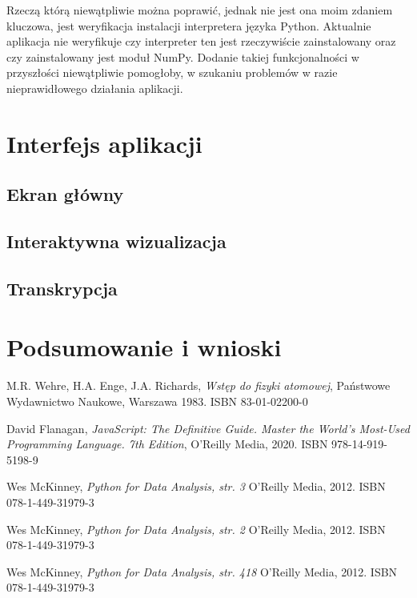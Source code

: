 \documentclass{SGGW-thesis}
\begin{document}
	Rzeczą którą niewątpliwie można poprawić, jednak nie jest ona moim zdaniem kluczowa, jest weryfikacja instalacji interpretera języka Python. Aktualnie aplikacja nie weryfikuje czy interpreter ten jest rzeczywiście zainstalowany oraz czy zainstalowany jest moduł NumPy. Dodanie takiej funkcjonalności w przyszłości niewątpliwie pomogłoby, w szukaniu problemów w razie nieprawidłowego działania aplikacji.
	

\chapter{Interfejs aplikacji}
	\section{Ekran główny}
	\section{Interaktywna wizualizacja}
	\section{Transkrypcja}
	
\chapter{Podsumowanie i wnioski}


\begin{thebibliography}{9}
	M.R. Wehre, H.A. Enge, J.A. Richards,
	\textit{Wstęp do fizyki atomowej}, 
	Państwowe Wydawnictwo Naukowe, Warszawa 1983. ISBN 83-01-02200-0

	David Flanagan, 
	\textit{JavaScript: The Definitive Guide. Master the World's Most-Used Programming Language. 7th Edition}, 
	O'Reilly Media, 2020. ISBN 978-14-919-5198-9
	
	Wes McKinney,
	\textit{Python for Data Analysis, str. 3}
	O'Reilly Media, 2012. ISBN 078-1-449-31979-3
	
	Wes McKinney,
	\textit{Python for Data Analysis, str. 2}
	O'Reilly Media, 2012. ISBN 078-1-449-31979-3
	
	Wes McKinney,
	\textit{Python for Data Analysis, str. 418}
	O'Reilly Media, 2012. ISBN 078-1-449-31979-3
	
	
	
\end{thebibliography}

\beforelastpage
\end{document}
